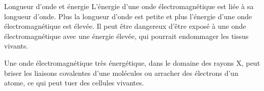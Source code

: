 \begin{doc}{Longueur d'onde et énergie}
  L'énergie d'une onde électromagnétique est liée à sa longueur d'onde.
  Plus la longueur d'onde est petite et plus l'énergie d'une onde électromagnétique est élevée. 
  Il peut être dangereux d'être exposé à une onde électromagnétique avec une énergie élevée, qui pourrait endommager les tissus vivants.
  
  Une onde électromagnétique très énergétique, dans le domaine des rayons X, peut briser les liaisons covalentes d'une molécules ou arracher des électrons d'un atome, ce qui peut tuer des cellules vivantes.
\end{doc}

